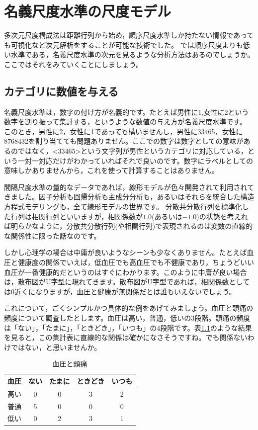 \documentclass{ltjsbook}
\begin{document}
\chapter{名義尺度水準の尺度モデル}
\label{H09_dual}

多次元尺度構成法は距離行列から始め，順序尺度水準しか持たない情報であっても可視化など次元解析をすることが可能な技術でした。
では順序尺度よりも低い水準である，名義尺度水準の次元を見るような分析方法はあるのでしょうか。ここではそれをみていくことにしましょう。

\section{カテゴリに数値を与える}

名義尺度水準は，数字の付け方が名義的です。たとえば男性に1,女性に2という数字を割り振って集計する，というような数値の与え方が名義尺度水準です。
このとき，男性に2，女性に1であっても構いませんし，男性に33465，女性に8768432を割り当てても問題ありません。ここでの数字は数字としての意味があるのではなく，<33465>という文字列が男性というカテゴリに対応している，という一対一対応だけがわかっていればそれで良いのです。数字にラベルとしての意味しかありませんから，これを使って計算することはありません。

間隔尺度水準の量的なデータであれば，線形モデルが色々開発されて利用されてきました。因子分析も回帰分析も主成分分析も，あるいはそれらを統合した構造方程式モデリングも，全て線形モデルの世界です。
分散共分散行列を標準化した行列は相関行列といいますが，相関係数が$1.0$(あるいは$-1.0$)の状態を考えれば明らかなように，分散共分散行列(や相関行列)で表現されるのは変数の直線的な関係性に限った話なのです。

しかし心理学の場合は中庸が良いようなシーンも少なくありません。たとえば血圧と健康度の関係でいえば，低血圧でも高血圧でも不健康であり，ちょうどいい血圧が一番健康的だというのはすぐにわかります。このように中庸が良い場合は，散布図がU字型に現れてきます。散布図がU字型であれば，相関係数としては0近くになりますが，血圧と健康が無関係だとは誰もいえないでしょう。

これについて，ごくシンプルかつ具体的な例をあげてみましょう。血圧と頭痛の頻度について調査したとします。血圧は高い，普通，低いの3段階。頭痛の頻度は「ない」，「たまに」，「ときどき」，「いつも」の4段階です。表\ref{tbl::14_01}のような結果を見ると，この集計表に直線的な関係は確かになさそうですね。でも関係ないわけではない，と思いませんか。
\begin{table}[ht]
	\begin{center}
		\caption{血圧と頭痛}
		\begin{tabular}{c|cccc}
			血圧 & ない & たまに & ときどき & いつも \\
			\hline
			高い & 0  & 0   & 3    & 2   \\
			普通 & 5  & 0   & 0    & 0   \\
			低い & 0  & 2   & 3    & 1   \\
		\end{tabular}
		\label{tbl::14_01}
	\end{center}
\end{table}
\end{document}
